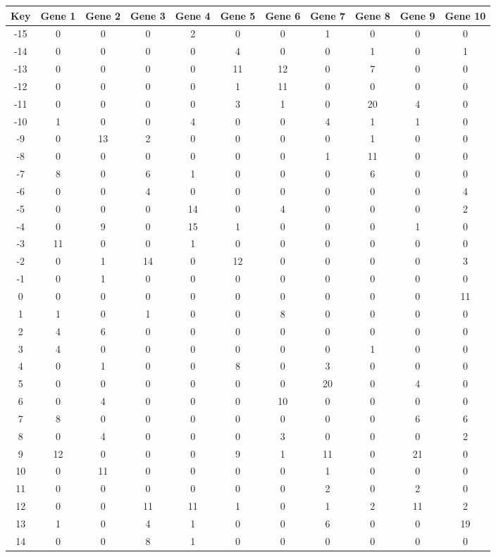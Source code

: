 \begin{tabular}{|c|c|c|c|c|c|c|c|c|c|c|}
\hline
Key & Gene 1 & Gene 2 & Gene 3 & Gene 4 & Gene 5 & Gene 6 & Gene 7 & Gene 8 & Gene 9 & Gene 10 \\
\hline
-15 & 0 & 0 & 0 & 2 & 0 & 0 & 1 & 0 & 0 & 0 \\
-14 & 0 & 0 & 0 & 0 & 4 & 0 & 0 & 1 & 0 & 1 \\
-13 & 0 & 0 & 0 & 0 & 11 & 12 & 0 & 7 & 0 & 0 \\
-12 & 0 & 0 & 0 & 0 & 1 & 11 & 0 & 0 & 0 & 0 \\
-11 & 0 & 0 & 0 & 0 & 3 & 1 & 0 & 20 & 4 & 0 \\
-10 & 1 & 0 & 0 & 4 & 0 & 0 & 4 & 1 & 1 & 0 \\
-9 & 0 & 13 & 2 & 0 & 0 & 0 & 0 & 1 & 0 & 0 \\
-8 & 0 & 0 & 0 & 0 & 0 & 0 & 1 & 11 & 0 & 0 \\
-7 & 8 & 0 & 6 & 1 & 0 & 0 & 0 & 6 & 0 & 0 \\
-6 & 0 & 0 & 4 & 0 & 0 & 0 & 0 & 0 & 0 & 4 \\
-5 & 0 & 0 & 0 & 14 & 0 & 4 & 0 & 0 & 0 & 2 \\
-4 & 0 & 9 & 0 & 15 & 1 & 0 & 0 & 0 & 1 & 0 \\
-3 & 11 & 0 & 0 & 1 & 0 & 0 & 0 & 0 & 0 & 0 \\
-2 & 0 & 1 & 14 & 0 & 12 & 0 & 0 & 0 & 0 & 3 \\
-1 & 0 & 1 & 0 & 0 & 0 & 0 & 0 & 0 & 0 & 0 \\
0 & 0 & 0 & 0 & 0 & 0 & 0 & 0 & 0 & 0 & 11 \\
1 & 1 & 0 & 1 & 0 & 0 & 8 & 0 & 0 & 0 & 0 \\
2 & 4 & 6 & 0 & 0 & 0 & 0 & 0 & 0 & 0 & 0 \\
3 & 4 & 0 & 0 & 0 & 0 & 0 & 0 & 1 & 0 & 0 \\
4 & 0 & 1 & 0 & 0 & 8 & 0 & 3 & 0 & 0 & 0 \\
5 & 0 & 0 & 0 & 0 & 0 & 0 & 20 & 0 & 4 & 0 \\
6 & 0 & 4 & 0 & 0 & 0 & 10 & 0 & 0 & 0 & 0 \\
7 & 8 & 0 & 0 & 0 & 0 & 0 & 0 & 0 & 6 & 6 \\
8 & 0 & 4 & 0 & 0 & 0 & 3 & 0 & 0 & 0 & 2 \\
9 & 12 & 0 & 0 & 0 & 9 & 1 & 11 & 0 & 21 & 0 \\
10 & 0 & 11 & 0 & 0 & 0 & 0 & 1 & 0 & 0 & 0 \\
11 & 0 & 0 & 0 & 0 & 0 & 0 & 2 & 0 & 2 & 0 \\
12 & 0 & 0 & 11 & 11 & 1 & 0 & 1 & 2 & 11 & 2 \\
13 & 1 & 0 & 4 & 1 & 0 & 0 & 6 & 0 & 0 & 19 \\
14 & 0 & 0 & 8 & 1 & 0 & 0 & 0 & 0 & 0 & 0 \\
\hline
\end{tabular}